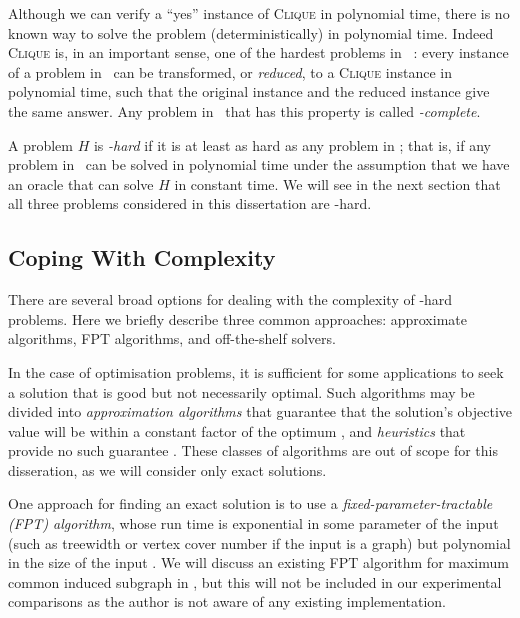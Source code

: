 Although we can verify a ``yes'' instance of \textsc{Clique} in polynomial
time, there is no known way to solve the problem (deterministically) in polynomial time.
Indeed \textsc{Clique} is, in an important sense, one of the hardest problems in \NP\
\citep{DBLP:conf/coco/Karp72}: every instance of a problem in \NP\ can be
transformed, or \emph{reduced}, to a \textsc{Clique} instance in polynomial
time, such that the original instance and the reduced instance give the same
answer.  Any problem in \NP\ that has this property is called \emph{\NP-complete}.

A problem $H$ is \emph{\NP-hard} if it is at least as hard as any problem in \NP;
that is, if any problem in \NP\ can be solved in polynomial time under the assumption
that we have an oracle that can solve $H$ in constant time.  We will see in the next
section that all three problems considered in this dissertation are \NP-hard.

\subsection{Coping With Complexity}

There are several broad options for dealing with the complexity of \NP-hard problems.
Here we briefly describe three common approaches: approximate algorithms, FPT
algorithms, and off-the-shelf solvers.

In the case of optimisation problems, it is sufficient for some applications to
seek a solution that is good but not necessarily optimal.
Such algorithms may be divided into \emph{approximation algorithms}
that guarantee that the solution's objective value will be within a constant factor
of the optimum \citep{DBLP:books/daglib/0004338}, and \emph{heuristics}
that provide no such guarantee \citep{talbi2009metaheuristics}.
These classes of algorithms are out of scope for this disseration, as we will
consider only exact solutions.

One approach for finding an exact solution is to use a \emph{fixed-parameter-tractable
(FPT) algorithm}, whose run time is exponential in some parameter of the input
(such as treewidth or vertex cover number if the input is a graph) but polynomial
in the size of the input \citep{DBLP:books/ox/Niedermeier06}.
We will discuss an existing FPT algorithm for maximum common induced subgraph
in \Cref{mcis-fpt-algorithms}, but this will not be included in our experimental
comparisons as the author is not aware of any existing implementation.

